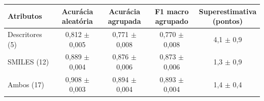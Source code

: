 \begin{tabular}{lcccc}
\toprule
Atributos & \shortstack{Acurácia\\aleatória} & \shortstack{Acurácia\\agrupada} & \shortstack{F1 macro\\agrupado} & \shortstack{Superestimativa\\(pontos)} \\
\midrule
Descritores (5) & 0,812 $\pm$ 0,005 & 0,771 $\pm$ 0,008 & 0,770 $\pm$ 0,008 & 4,1 $\pm$ 0,9 \\
SMILES (12) & 0,889 $\pm$ 0,004 & 0,876 $\pm$ 0,006 & 0,873 $\pm$ 0,006 & 1,3 $\pm$ 0,9 \\
Ambos (17) & 0,908 $\pm$ 0,003 & 0,894 $\pm$ 0,004 & 0,893 $\pm$ 0,004 & 1,4 $\pm$ 0,4 \\
\bottomrule
\end{tabular}
